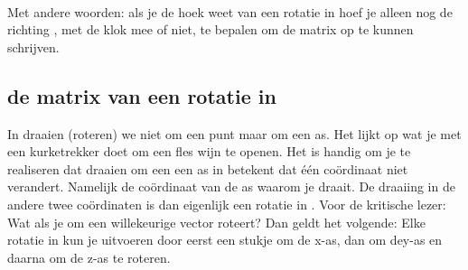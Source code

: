 \documentclass[hidelinks, a4wide, 12pt,  twoside]{book}
\begin{document}

\\
Met andere woorden: als je de hoek weet van een rotatie in \RT hoef je alleen nog de richting , met de klok mee of niet,  te bepalen om de matrix op te kunnen schrijven.

\subsection{de matrix van een rotatie in \RD}
In \RD draaien (roteren) we niet om een punt maar om een as. Het lijkt op wat je met een kurketrekker doet om een fles wijn te openen. Het is handig om je te realiseren dat draaien om een een as in \RD betekent dat één coördinaat niet verandert. Namelijk de coördinaat van de as waarom je draait.  De draaiing in de andere twee coördinaten is dan eigenlijk een rotatie in \RT. Voor de kritische lezer: Wat als je  om een willekeurige vector roteert? Dan geldt het volgende: Elke rotatie in \RD kun je uitvoeren door eerst een stukje om de x-as, dan om dey-as en daarna om de z-as te roteren.



\end{document}
